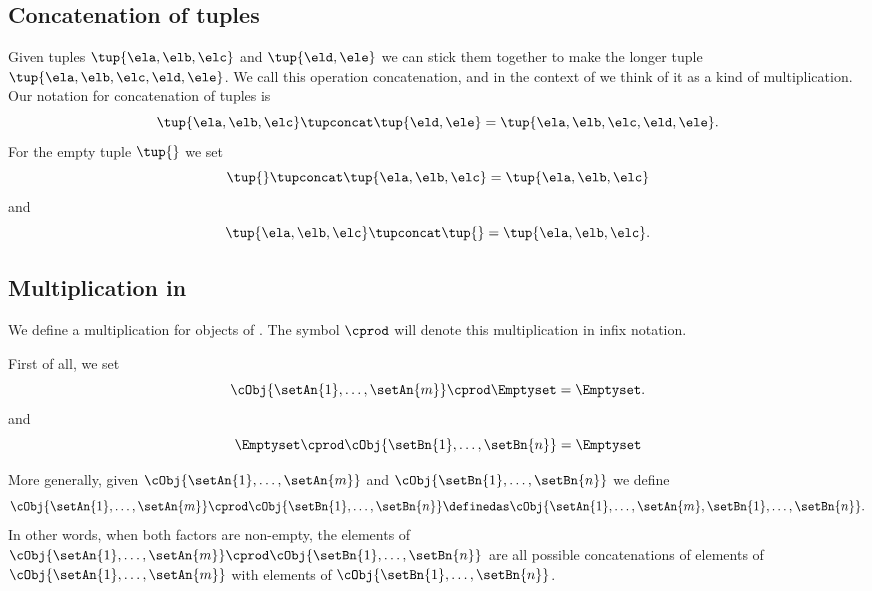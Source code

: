 \subsection{Concatenation of tuples}

Given tuples $\tup{\ela, \elb, \elc}$ and $\tup{\eld, \ele}$ we can stick them together to make the longer tuple $\tup{\ela, \elb, \elc, \eld, \ele}$.
We call this operation concatenation, and in the context of \cCat{\Set} we think of it as a kind of multiplication.
Our notation for concatenation of tuples is
\begin{equation}
    \tup{\ela, \elb, \elc} \tupconcat \tup{\eld, \ele} = \tup{\ela, \elb, \elc, \eld, \ele}.
\end{equation}
For the empty tuple $\tup{  }$ we set
\begin{equation*}
    \tup{} \tupconcat \tup{\ela, \elb, \elc}  = \tup{\ela, \elb, \elc}
\end{equation*}
and
\begin{equation*}
    \tup{\ela, \elb, \elc}  \tupconcat \tup{ } = \tup{\ela, \elb, \elc}.
\end{equation*}


\subsection{Multiplication in \cCat{\Set}}

We define a multiplication for objects of \cCat{\Set}. The symbol $\cprod$ will denote this multiplication in infix notation.

First of all, we set
\begin{equation}
    \cObj{\setAn{1}, \dots, \setAn{m}} \cprod \Emptyset = \Emptyset.
\end{equation}
and
\begin{equation}
    \Emptyset \cprod \cObj{\setBn{1}, \dots, \setBn{n}} = \Emptyset
\end{equation}

More generally, given $\cObj{\setAn{1}, \dots, \setAn{m}}$ and $\cObj{\setBn{1},  \dots, \setBn{n}}$ we define
\begin{equation}
\label{eq:strict-monoidal-product-sets}
   \cObj{\setAn{1}, \dots, \setAn{m}} \cprod \cObj{\setBn{1}, \dots, \setBn{n}} \definedas \cObj{\setAn{1}, \dots, \setAn{m}, \setBn{1},  \dots, \setBn{n}}.
\end{equation}
In other words, when both factors are non-empty, the elements of $\cObj{\setAn{1}, \dots, \setAn{m}} \cprod \cObj{\setBn{1}, \dots, \setBn{n}}$ are all possible concatenations of elements of $\cObj{\setAn{1}, \dots, \setAn{m}}$ with elements of $\cObj{\setBn{1}, \dots, \setBn{n}}$.

